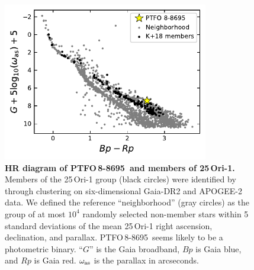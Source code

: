 \documentclass[12pt,twocolumn,tighten]{aastex62}
\newcommand{\ptfo}{PTFO$\,$8-8695}
\begin{document}
\begin{figure}[t]
	\begin{center}
		\leavevmode
		\includegraphics[width=0.8\textwidth]{f6.pdf}
	\end{center}
	\vspace{-0.7cm}
	\caption{ {\bf HR diagram of \ptfo\ and members of 25$\,$Ori-1.}
  Members of the 25$\,$Ori-1 group (black circles) were identified by
  \citet{kounkel_apogee2_2018} through clustering on six-dimensional
  Gaia-DR2 and APOGEE-2 data.  We defined the reference
  ``neighborhood'' (gray circles) as the group of at most $10^4$
  randomly selected non-member stars within 5 standard deviations of
  the mean 25$\,$Ori-1 right ascension, declination, and parallax.
  \ptfo\ seems likely to be a photometric binary.
  ``$G$'' is the Gaia broadband, $Bp$ is Gaia blue, and $Rp$ is Gaia red.
  $\omega_{\rm as}$ is the parallax in arcseconds.
	\label{fig:gaia}
	}
\end{figure}
\end{document}
